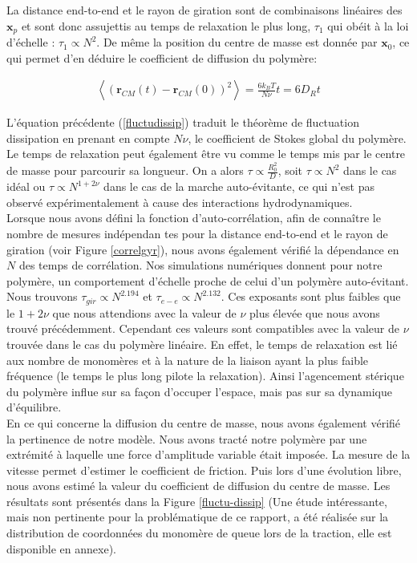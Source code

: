 \documentclass[a4paper,11pt]{article}
\begin{document}
La distance end-to-end et le rayon de giration sont de combinaisons linéaires des $\textbf{x}_p$ et sont donc assujettis  au temps de relaxation le plus long, $\tau_1$ qui obéit à la loi d'échelle : $\tau_1 \propto N^2$. De même la position du centre de masse est donnée par $\textbf{x}_0$, ce qui permet d'en déduire le coefficient de diffusion du polymère:


\begin{eqnarray}
\left<(\textbf{r}_{CM}(t)-\textbf{r}_{CM}(0))^2\right>=\frac{6 k_B T}{N \nu} t = 6 D_R t
\label{fluctudissip}
\end{eqnarray}

L'équation précédente (\ref{fluctudissip}) traduit le théorème de fluctuation dissipation  en prenant en compte $N \nu$, le coefficient de Stokes global du polymère. Le temps de relaxation peut également être vu comme le temps mis par le centre de masse pour parcourir sa longueur. On a alors $\tau \propto \frac{R_0^2}{D}$, soit $\tau \propto N^2 $ dans le cas idéal ou $\tau \propto N^{1+2\nu} $ dans le cas de la marche auto-évitante, ce qui n'est pas observé expérimentalement à cause des interactions hydrodynamiques.\\

Lorsque nous avons défini la fonction d'auto-corrélation, afin de connaître le nombre de mesures indépendan\- tes pour la distance end-to-end et le rayon de giration (voir Figure \ref{correlgyr}), nous avons également vérifié la dépendance en $N$ des temps de corrélation. Nos simulations numériques donnent pour notre polymère, un comportement d'échelle proche de celui d'un polymère auto-évitant. Nous trouvons $\tau_{gir} \propto N^{2.194}$ et $\tau_{e-e} \propto N^{2.132}$. Ces exposants sont plus faibles que le $1+2\nu$ que nous attendions avec la valeur de $\nu$ plus élevée que nous avons trouvé précédemment. Cependant ces valeurs sont compatibles avec la valeur de $\nu$ trouvée dans le cas du polymère linéaire. En effet, le temps de relaxation est lié aux nombre de monomères et à la nature de la liaison ayant la plus faible fréquence (le temps le plus long pilote la relaxation). Ainsi l'agencement stérique du polymère influe sur sa façon d'occuper l'espace, mais pas sur sa dynamique d'équilibre.\\

En ce qui concerne la diffusion du centre de masse, nous avons également vérifié la pertinence de notre modèle. Nous avons tracté notre polymère par une extrémité à laquelle une force d'amplitude variable était imposée. La mesure de la vitesse permet d'estimer le coefficient de friction. Puis lors d'une évolution libre, nous avons estimé la valeur du coefficient de diffusion du centre de masse. Les résultats sont présentés dans la Figure \ref{fluctu-dissip} (Une étude intéressante, mais non pertinente pour la problématique de ce rapport, a été réalisée sur la distribution de coordonnées du monomère de queue lors de la traction, elle est disponible en annexe).
\end{document}
